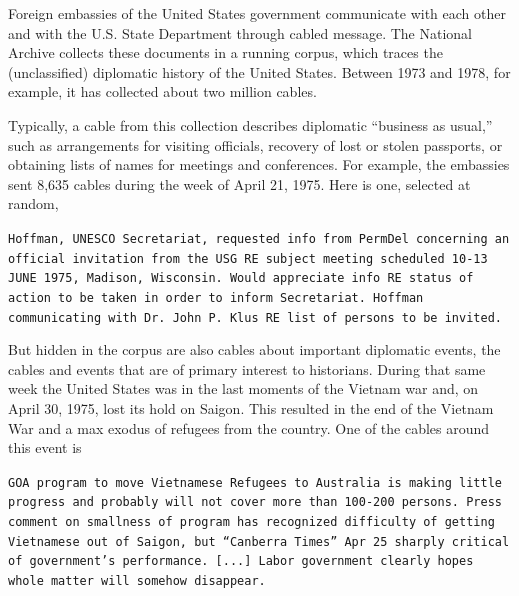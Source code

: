 
Foreign embassies of the United States government communicate with
each other and with the U.S. State Department through cabled message.
The National Archive collects these documents in a running corpus,
which traces the (unclassified) diplomatic history of the United
States. Between 1973 and 1978, for example, it has collected about two
million cables.

Typically, a cable from this collection describes diplomatic ``business as usual,'' such as arrangements for visiting officials, recovery of lost or stolen passports, or obtaining lists of names for meetings and conferences. For example,
the embassies sent 8,635 cables during the week of April 21, 1975. Here is one,
selected at random,
\begin{shaded*} \tt{Hoffman, UNESCO Secretariat, requested info from
PermDel concerning an official invitation from the USG
RE subject meeting scheduled 10-13 JUNE 1975, Madison,
Wisconsin.  Would appreciate info RE status of action to 
be taken in order to inform Secretariat.  Hoffman communicating 
with Dr.~John P.~Klus RE list of persons to be invited.}
\end{shaded*}

But hidden in the corpus are also cables about important diplomatic
events, the cables and events that are of primary interest to
historians. During that same week the United States was in the last
moments of the Vietnam war and, on April 30, 1975, lost its hold on Saigon. This resulted in the end of the Vietnam War and a max exodus of refugees from the country.  One
of the cables around this event is
\begin{shaded*}
  \tt{GOA program to move Vietnamese Refugees to Australia
  is making little progress and probably will not cover more than
  100-200 persons.  Press comment on smallness of program has
  recognized difficulty of getting Vietnamese out of Saigon, but
  ``Canberra Times'' Apr 25 sharply critical of government's
  performance.  [...]
  Labor government clearly hopes whole
  matter will somehow disappear.}
\end{shaded*}

